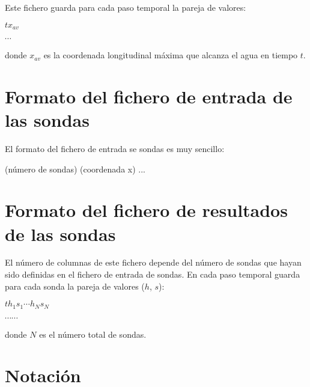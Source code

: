 \documentclass[a4paper,12pt]{report}
\begin{document}
Este fichero guarda para cada paso temporal la pareja de valores:

\hspace{1.8cm}$t$\hspace{0.9cm}$x_{av}$

\hspace{1.8cm} $\cdots$

\noindent donde $x_{av}$ es la coordenada longitudinal máxima que alcanza el agua en tiempo $t$.
 


\section{Formato del fichero de entrada de las sondas}
 
El formato del fichero de entrada se sondas es muy sencillo:

\begin{verbatimtab}
	(número de sondas)
	(coordenada x)
	...
\end{verbatimtab}

\section{Formato del fichero de resultados de las sondas}
El número de columnas de este fichero depende del número de sondas que hayan sido definidas en el fichero de entrada de sondas. 
En cada paso temporal guarda para cada sonda la pareja de valores ($h$, $s$):

\hspace{1.8cm}$t$\hspace{0.9cm}$h_1$\hspace{0.9cm}$s_1$\hspace{0.9cm}$\cdots$\hspace{0.9cm}$h_N$\hspace{0.9cm}$s_N$

\hspace{3.8cm} $\cdots \cdots$

\noindent donde $N$ es el número total de sondas. 

\clearpage
\section*{Notación}
\end{document}
